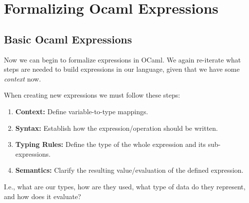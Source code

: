 \section{Formalizing Ocaml Expressions}

\subsection{Basic Ocaml Expressions}
\label{sec:formalizing-ocaml-expressions}

\noindent
Now we can begin to formalize expressions
in OCaml. We again re-iterate what steps are needed to build expressions
in our language, given that we have some \textit{context} now.

\begin{Def}

    When creating new expressions we must follow these steps:
    \begin{enumerate}
        \item \textbf{Context:} Define variable-to-type mappings.
        \item \textbf{Syntax:} Establish how the expression/operation should be written.
        \item \textbf{Typing Rules:} Define the type of the whole expression and its sub-expressions.
        \item \textbf{Semantics:} Clarify the resulting value/evaluation of the defined expression.
    \end{enumerate}
    I.e., what are our types, how are they used, what type of data do they represent, and how does it evaluate?
\end{Def}

